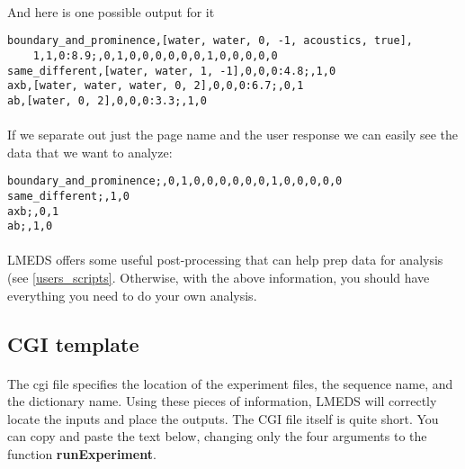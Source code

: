 \paragraph{}
And here is one possible output for it

\begin{lstlisting}
boundary_and_prominence,[water, water, 0, -1, acoustics, true],
	1,1,0:8.9;,0,1,0,0,0,0,0,0,1,0,0,0,0,0
same_different,[water, water, 1, -1],0,0,0:4.8;,1,0
axb,[water, water, water, 0, 2],0,0,0:6.7;,0,1
ab,[water, 0, 2],0,0,0:3.3;,1,0
\end{lstlisting}

\paragraph{}
If we separate out just the page name and the user response we can easily see the data that we want to analyze: 

\begin{lstlisting}
boundary_and_prominence;,0,1,0,0,0,0,0,0,1,0,0,0,0,0
same_different;,1,0
axb;,0,1
ab;,1,0
\end{lstlisting}

\paragraph{}
LMEDS offers some useful post-processing that can help prep data for analysis (see \ref{users_scripts}.  Otherwise, with the above information, you should have everything you need to do your own analysis.

\subsection{CGI template}
\label{sec:cgitemplate}

\paragraph{}
The cgi file  specifies the location of the experiment files, the sequence name, and the dictionary name.  Using these pieces of information, LMEDS will correctly locate the inputs and place the outputs.  The CGI file itself is quite short.  You can copy and paste the text below, changing only the four arguments to the function \textbf{runExperiment}.

\paragraph{}

